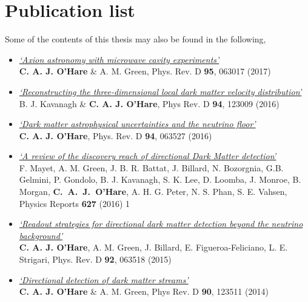 \documentclass[a4paper, 12pt]{Thesis}
\begin{document}
\clearpage  %
\chapter*{Publication list}
Some of the contents of this thesis may also be found in the following,
\begin{itemize}
\setlength\itemsep{0.01em}
\item[~\cite{OHare:2017yze}]{\href{http://arxiv.org/abs/1701.03118}{\it `Axion astronomy with microwave cavity experiments'}\\ {\bf C. A. J. O'Hare} \& A. M. Green, Phys. Rev. D {\bf 95}, 063017 (2017)}
\item[~\cite{Kavanagh:2016xfi}]{\href{http://arxiv.org/abs/1609.08630}{\it `Reconstructing the three-dimensional local dark matter velocity distribution'}\\ B. J. Kavanagh \& {\bf C. A. J. O'Hare}, Phys Rev. D {\bf 94}, 123009 (2016)}
\item[~\cite{OHare:2016pjy}]{\href{http://arxiv.org/abs/1604.03858}{\it `Dark matter astrophysical uncertainties and the neutrino floor'}\\ {\bf C. A. J. O'Hare}, Phys. Rev. D {\bf 94}, 063527 (2016)}
 \item[~\cite{Mayet:2016zxu}]{\href{http://arxiv.org/abs/1602.03781}{\it `A review of the discovery reach of directional Dark Matter detection'}\\ F. Mayet, A. M. Green, J. B. R. Battat, J. Billard, N. Bozorgnia, G.B. Gelmini, P. Gondolo, B. J. Kavanagh, S. K. Lee, D. Loomba, J. Monroe, B. Morgan, {\bf C.~A.~J.~O'Hare}, A. H. G. Peter, N. S. Phan, S. E. Vahsen, Physics Reports {\bf 627} (2016) 1}
\item[~\cite{O'Hare:2015mda}]{\href{http://arxiv.org/abs/1505.08061}{\it `Readout strategies for directional dark matter detection beyond the neutrino background'}\\ {\bf C. A. J. O'Hare}, A. M. Green, J. Billard, E. Figueroa-Feliciano, L. E. Strigari, Phys. Rev. D {\bf 92}, 063518 (2015)}
\item[~\cite{O'Hare:2014oxa}]{\href{http://arxiv.org/abs/1410.2749}{\it `Directional detection of dark matter streams'}\\ {\bf C. A. J. O'Hare} \& A. M. Green, Phys Rev. D {\bf 90}, 123511 (2014)}
\end{itemize}
\end{document}
